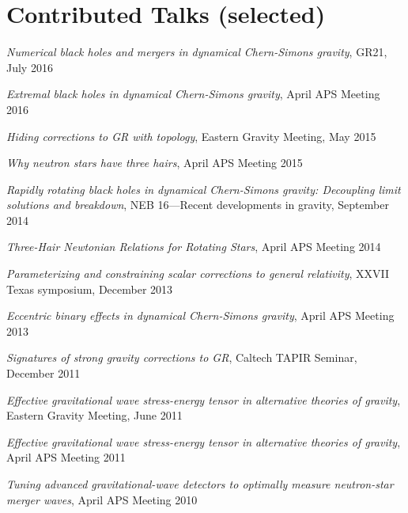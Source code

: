 \section{\sc Contributed Talks (selected)}
\begin{etaremune}
\item
  {\it Numerical black holes and mergers in dynamical
    Chern-Simons gravity},
  GR21, July 2016
\item
  {\it Extremal black holes in dynamical Chern-Simons gravity},
  April APS Meeting 2016
\item
  {\it Hiding corrections to GR with topology},
  Eastern Gravity Meeting, May 2015
\item
  {\it Why neutron stars have three hairs},
  April APS Meeting 2015
\item
  {\it Rapidly rotating black holes in dynamical Chern-Simons gravity:
    Decoupling limit solutions and breakdown},
  NEB 16---Recent developments in gravity, September 2014
\item
  {\it Three-Hair Newtonian Relations for Rotating Stars},
  April APS Meeting 2014
\item
  {\it Parameterizing and constraining scalar corrections to general relativity},
 XXVII Texas symposium, December 2013
\item
  {\it Eccentric binary effects in dynamical Chern-Simons gravity},
  April APS Meeting 2013
\item
  {\it Signatures of strong gravity corrections to GR},
  Caltech TAPIR Seminar, December 2011
\item
  {\it Effective gravitational wave stress-energy tensor in alternative theories of gravity},
  Eastern Gravity Meeting, June 2011
\item
  {\it Effective gravitational wave stress-energy tensor in alternative theories of gravity},
  April APS Meeting 2011
\item
  {\it Tuning advanced gravitational-wave detectors to optimally measure neutron-star merger waves},
  April APS Meeting 2010
\end{etaremune}


